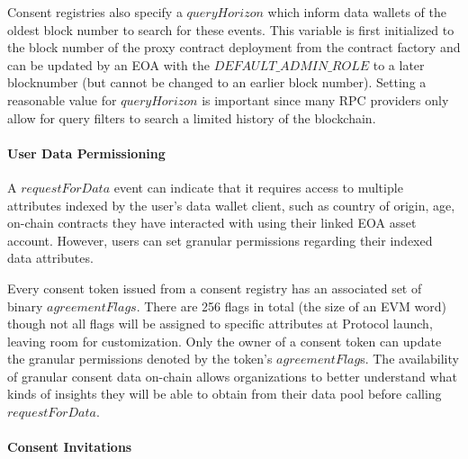 Consent registries also specify a $queryHorizon$ which inform data wallets of the oldest block number to search for these events. This variable is 
first initialized to the block number of the proxy contract deployment from the contract factory and can be updated by an EOA with the $DEFAULT\_ADMIN\_ROLE$
to a later blocknumber (but cannot be changed to an earlier block number). Setting a reasonable value for $queryHorizon$ is important since many RPC providers
only allow for query filters to search a limited history of the blockchain.

\paragraph{User Data Permissioning}
\label{section:UserPermissions}

A $requestForData$ event can indicate that it requires access to multiple attributes indexed by the user's data wallet client, such as country of origin, age,
on-chain contracts they have interacted with using their linked EOA asset account. However, users can set granular permissions regarding their indexed data 
attributes. 

Every consent token issued from a consent registry has an associated set of binary $agreementFlags$. There are 256 flags in total (the size of an EVM word) 
though not all flags will be assigned to specific attributes at Protocol launch, leaving room for customization. Only the owner of a consent token can 
update the granular permissions denoted by the token's $agreementFlag$s. The availability of granular consent data on-chain allows organizations to better 
understand what kinds of insights they will be able to obtain from their data pool before calling $requestForData$. 

\paragraph{Consent Invitations}
\label{section:ConsentInvitations}

